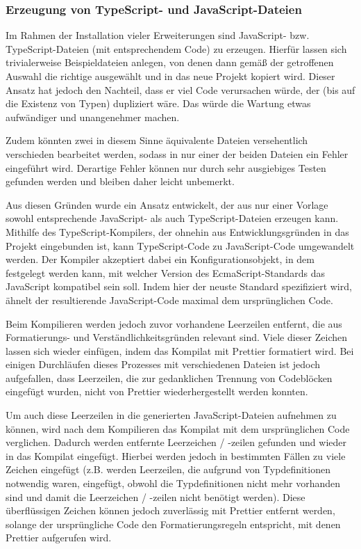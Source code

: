 \subsubsection{Erzeugung von TypeScript- und JavaScript-Dateien}
\label{impl:js_from_ts}
Im Rahmen der Installation vieler Erweiterungen sind JavaScript- bzw. TypeScript-Dateien (mit entsprechendem Code) zu erzeugen. Hierfür lassen sich trivialerweise Beispieldateien anlegen, von denen dann gemäß der getroffenen Auswahl die richtige ausgewählt und in das neue Projekt kopiert wird. Dieser Ansatz hat jedoch den Nachteil, dass er viel Code verursachen würde, der (bis auf die Existenz von Typen) dupliziert wäre. Das würde die Wartung etwas aufwändiger und unangenehmer machen.

Zudem könnten zwei in diesem Sinne äquivalente Dateien versehentlich verschieden bearbeitet werden, sodass in nur einer der beiden Dateien ein Fehler eingeführt wird. Derartige Fehler können nur durch sehr ausgiebiges Testen gefunden werden und bleiben daher leicht unbemerkt.

Aus diesen Gründen wurde ein Ansatz entwickelt, der aus nur einer Vorlage sowohl entsprechende JavaScript- als auch TypeScript-Dateien erzeugen kann. Mithilfe des TypeScript-Kompilers, der ohnehin aus Entwicklungsgründen in das Projekt eingebunden ist, kann TypeScript-Code zu JavaScript-Code umgewandelt werden. Der Kompiler akzeptiert dabei ein Konfigurationsobjekt, in dem festgelegt werden kann, mit welcher Version des EcmaScript-Standards das JavaScript kompatibel sein soll. Indem hier der neuste Standard spezifiziert wird, ähnelt der resultierende JavaScript-Code maximal dem ursprünglichen Code.

Beim Kompilieren werden jedoch zuvor vorhandene Leerzeilen entfernt, die aus Formatierungs- und Verständlichkeitsgründen relevant sind. Viele dieser Zeichen lassen sich wieder einfügen, indem das Kompilat mit Prettier formatiert wird. Bei einigen Durchläufen dieses Prozesses mit verschiedenen Dateien ist jedoch aufgefallen, dass Leerzeilen, die zur gedanklichen Trennung von Codeblöcken eingefügt wurden, nicht von Prettier wiederhergestellt werden konnten.

Um auch diese Leerzeilen in die generierten JavaScript-Dateien aufnehmen zu können, wird nach dem Kompilieren das Kompilat mit dem ursprünglichen Code verglichen. Dadurch werden entfernte Leerzeichen / -zeilen gefunden und wieder in das Kompilat eingefügt. Hierbei werden jedoch in bestimmten Fällen zu viele Zeichen eingefügt (z.B. werden Leerzeilen, die aufgrund von Typdefinitionen notwendig waren, eingefügt, obwohl die Typdefinitionen nicht mehr vorhanden sind und damit die Leerzeichen / -zeilen nicht benötigt werden). Diese überflüssigen Zeichen können jedoch zuverlässig mit Prettier entfernt werden, solange der ursprüngliche Code den Formatierungsregeln entspricht, mit denen Prettier aufgerufen wird.

